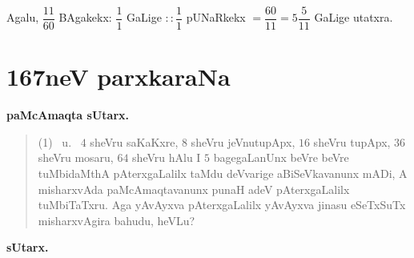 Agalu, $\dfrac{11}{60}$ BAgakekx: $\dfrac{1}{1}$ GaLige
$::\dfrac{1}{1}$ pUNaRkekx $=\dfrac{60}{11}=5\dfrac{5}{11}$ GaLige
utatxra. 


\chapter{167neV parxkaraNa}

\begin{center}
{\large\bf paMcAmaqta sUtarx.}
\end{center}

\begin{verse}
{\rm(1)}~ u.~ $4$ sheVru saKaKxre, $8$ sheVru jeVnutupApx, $16$ sheVru
tupApx, $36$ sheVru mosaru, $64$ sheVru hAlu I $5$ bagegaLanUnx beVre
beVre tuMbidaMthA pAterxgaLalilx taMdu deVvarige aBiSeVkavanunx mADi,
A misharxvAda paMcAmaqtavanunx punaH adeV pAterxgaLalilx
tuMbiTaTxru. Aga yAvAyxva pAterxgaLalilx yAvAyxva jinasu eSeTxSuTx
misharxvAgira bahudu, heVLu?
\end{verse}

\medskip
\begin{center}
{\large\bf sUtarx.}
\end{center}

